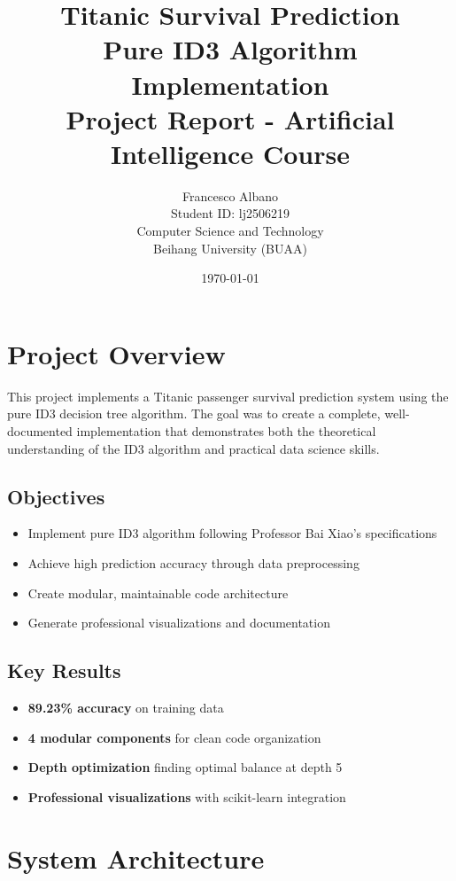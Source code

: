 \documentclass[12pt,a4paper]{article}
\title{
    \vspace{2cm}
    \Huge \textbf{Titanic Survival Prediction} \\
    \vspace{0.5cm}
    \Large Pure ID3 Algorithm Implementation \\
    \vspace{1cm}
    \large Project Report - Artificial Intelligence Course
}
\author{
    Francesco Albano \\
    Student ID: lj2506219 \\
    Computer Science and Technology \\
    Beihang University (BUAA)
}
\date{\today}
\begin{document}
\maketitle
\thispagestyle{empty}
\newpage

\tableofcontents
\newpage

\section{Project Overview}

This project implements a Titanic passenger survival prediction system using the pure ID3 decision tree algorithm. The goal was to create a complete, well-documented implementation that demonstrates both the theoretical understanding of the ID3 algorithm and practical data science skills.

\subsection{Objectives}
\begin{itemize}
    \item Implement pure ID3 algorithm following Professor Bai Xiao's specifications
    \item Achieve high prediction accuracy through data preprocessing
    \item Create modular, maintainable code architecture
    \item Generate professional visualizations and documentation
\end{itemize}

\subsection{Key Results}
\begin{itemize}
    \item \textbf{89.23\% accuracy} on training data
    \item \textbf{4 modular components} for clean code organization
    \item \textbf{Depth optimization} finding optimal balance at depth 5
    \item \textbf{Professional visualizations} with scikit-learn integration
\end{itemize}

\section{System Architecture}
\end{document}
